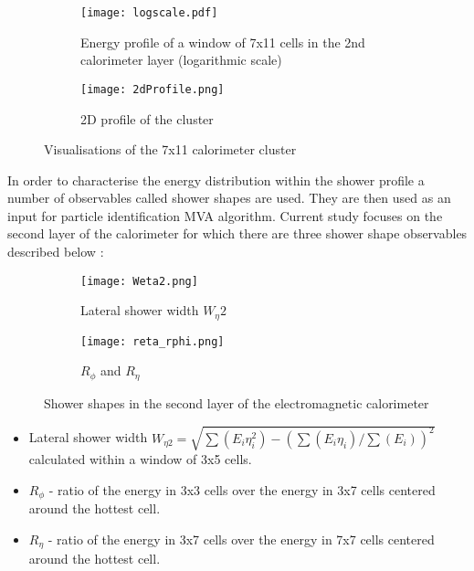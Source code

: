   
    	\begin{figure}[htbp]
  	\begin{subfigure}[t]{0.5\textwidth}
  		\texttt{[image: logscale.pdf]}
  		\caption{Energy profile of a window of 7x11 cells in the 2nd calorimeter layer (logarithmic scale)}
  		\label{fig::profile_log}
  	\end{subfigure}
  	\hfill
  	\begin{subfigure}[t]{0.5\textwidth} 
  		\texttt{[image: 2dProfile.png]}
  		\caption{2D profile of the cluster}
  		\label{fig::2d_profile}
  	\end{subfigure}
  	\caption{Visualisations of the 7x11 calorimeter cluster}
  	\label{fig::profiles}
  \end{figure}
  
  In order to characterise the energy distribution within the shower profile a number of observables called shower shapes are used. They are then used as an input for particle identification MVA algorithm. Current study focuses on the second layer of the calorimeter for which there are three shower shape observables described below \cite{egamma_perf_2017}:
  
    	\begin{figure}[htbp]
  	\begin{subfigure}[t]{0.4\textwidth}
  		\texttt{[image: Weta2.png]}
  		\caption[Lateral shower width $W_{\eta} 2$]{Lateral shower width $W_{\eta} 2$}
  		\label{fig::weta2}
  	\end{subfigure}
  	\hfill
  	\begin{subfigure}[t]{0.25\textwidth} 
  		\texttt{[image: reta\_rphi.png]}
  		\caption[$R_{\phi}$ and $R_{\eta}$]{$R_{\phi}$ and $R_{\eta}$}
  		\label{fig::reta_rphi}
  	\end{subfigure}
  	\caption{Shower shapes in the second layer of the electromagnetic calorimeter}
  	\label{fig::sshapes}
  \end{figure}
  
  \begin{itemize}
  	\item Lateral shower width $W_{\eta 2} = \sqrt{\sum(E_i \eta^{2}_{i})-(\sum(E_i \eta_{i})/\sum(E_i))^2}$ calculated within a window of 3x5 cells.
  	\item $R_{\phi}$ - ratio of the energy in 3x3 cells over the energy in 3x7 cells centered around the hottest cell.
  	\item $R_{\eta}$ - ratio of the energy in 3x7 cells over the energy in 7x7 cells centered around the hottest cell.
  \end{itemize}
  
